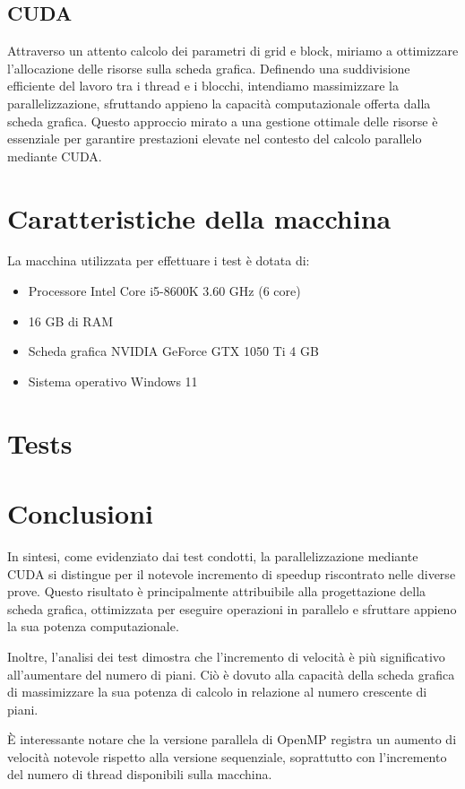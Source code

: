 \documentclass[11pt]{article}
\begin{document}
    \subsection{CUDA}\label{subsec:cuda}
    Attraverso un attento calcolo dei parametri di grid e block, miriamo a ottimizzare l'allocazione delle risorse sulla scheda grafica.
    Definendo una suddivisione efficiente del lavoro tra i thread e i blocchi, intendiamo massimizzare la parallelizzazione,
    sfruttando appieno la capacità computazionale offerta dalla scheda grafica.
    Questo approccio mirato a una gestione ottimale delle risorse è essenziale per garantire prestazioni elevate nel contesto
    del calcolo parallelo mediante CUDA\@.
    

    \section{Caratteristiche della macchina}\label{sec:caratteristiche-della-macchina}
    La macchina utilizzata per effettuare i test è dotata di:
    \begin{itemize}
        \item Processore Intel Core i5-8600K 3.60 GHz (6 core)
        \item 16 GB di RAM
        \item Scheda grafica NVIDIA GeForce GTX 1050 Ti 4 GB
        \item Sistema operativo Windows 11
    \end{itemize}

    \section{Tests}\label{sec:tests}
    

    \section{Conclusioni}\label{sec:conclusioni}
    In sintesi, come evidenziato dai test condotti, la parallelizzazione mediante CUDA si distingue per il notevole
    incremento di speedup riscontrato nelle diverse prove.
    Questo risultato è principalmente attribuibile alla progettazione della scheda grafica, ottimizzata per eseguire
    operazioni in parallelo e sfruttare appieno la sua potenza computazionale.

    Inoltre, l'analisi dei test dimostra che l'incremento di velocità è più significativo all'aumentare del numero di piani.
    Ciò è dovuto alla capacità della scheda grafica di massimizzare la sua potenza di calcolo in relazione al numero crescente di piani.

    È interessante notare che la versione parallela di OpenMP registra un aumento di velocità notevole rispetto alla versione sequenziale,
    soprattutto con l'incremento del numero di thread disponibili sulla macchina.
\end{document}
